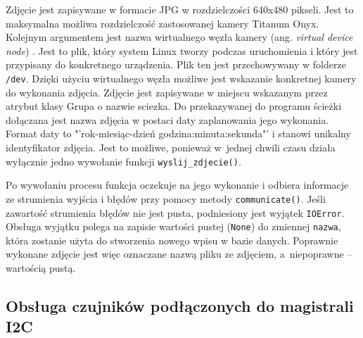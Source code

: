 \documentclass[a4paper,11pt,twoside]{article}
\begin{document}
Zdjęcie jest zapisywane w formacie JPG w rozdzielczości 640x480 pikseli. Jest to maksymalna możliwa rozdzielczość zastosowanej kamery Titanum Onyx. Kolejnym argumentem jest nazwa wirtualnego węzła kamery (ang. \textit{virtual device node}) \cite{dev_video}. Jest to plik, który system Linux tworzy podczas uruchomienia i który jest przypisany do konkretnego urządzenia. Plik ten jest przechowywany w folderze \texttt{/dev}. Dzięki użyciu wirtualnego węzła możliwe jest wskazanie konkretnej kamery do wykonania zdjęcia. Zdjęcie jest zapisywane w miejscu wskazanym przez atrybut klasy Grupa o nazwie sciezka. Do przekazywanej do programu ścieżki dołączana jest nazwa zdjęcia w postaci daty zaplanowania jego wykonania. Format daty to "'rok-miesiąc-dzień godzina:minuta:sekunda"' i stanowi unikalny identyfikator zdjęcia. Jest to możliwe, ponieważ w~jednej chwili czasu działa wyłącznie jedno wywołanie funkcji \texttt{wyslij{\_}zdjecie()}.

Po wywołaniu procesu funkcja oczekuje na jego wykonanie i odbiera informacje ze strumienia wyjścia i błędów przy pomocy metody \texttt{communicate()}. Jeśli zawartość strumienia błędów nie jest pusta, podniesiony jest wyjątek \texttt{IOError}. Obsługa wyjątku polega na zapisie wartości pustej (\texttt{None}) do zmiennej \texttt{nazwa}, która zostanie użyta do stworzenia nowego wpisu w bazie danych. Poprawnie wykonane zdjęcie jest więc oznaczane nazwą pliku ze zdjęciem, a~niepoprawne -- wartością pustą.
\subsection{Obsługa czujników podłączonych do magistrali I2C}
\end{document}
